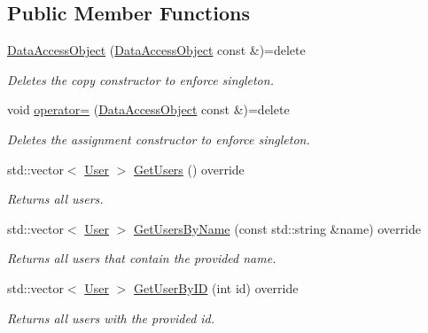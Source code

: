 \subsection*{Public Member Functions}
\begin{DoxyCompactItemize}
\item 
\mbox{\hyperlink{classcadg__rest_1_1_data_access_object_a406ab0c0f47900529133afc7db6c3bca}{Data\+Access\+Object}} (\mbox{\hyperlink{classcadg__rest_1_1_data_access_object}{Data\+Access\+Object}} const \&)=delete
\begin{DoxyCompactList}\small\item\em Deletes the copy constructor to enforce singleton. \end{DoxyCompactList}\item 
void \mbox{\hyperlink{classcadg__rest_1_1_data_access_object_ac17c7c54dd84c1d512c83cb6a15bb894}{operator=}} (\mbox{\hyperlink{classcadg__rest_1_1_data_access_object}{Data\+Access\+Object}} const \&)=delete
\begin{DoxyCompactList}\small\item\em Deletes the assignment constructor to enforce singleton. \end{DoxyCompactList}\item 
std\+::vector$<$ \mbox{\hyperlink{structcadg__rest_1_1_user}{User}} $>$ \mbox{\hyperlink{classcadg__rest_1_1_data_access_object_a52d1c1333fc65e6a3a6276d044296ca0}{Get\+Users}} () override
\begin{DoxyCompactList}\small\item\em Returns all users. \end{DoxyCompactList}\item 
std\+::vector$<$ \mbox{\hyperlink{structcadg__rest_1_1_user}{User}} $>$ \mbox{\hyperlink{classcadg__rest_1_1_data_access_object_af08156c296e0ec18d9885292a549eef8}{Get\+Users\+By\+Name}} (const std\+::string \&name) override
\begin{DoxyCompactList}\small\item\em Returns all users that contain the provided name. \end{DoxyCompactList}\item 
std\+::vector$<$ \mbox{\hyperlink{structcadg__rest_1_1_user}{User}} $>$ \mbox{\hyperlink{classcadg__rest_1_1_data_access_object_a54d23c50e3be7d80503f43e7ff82752e}{Get\+User\+By\+ID}} (int id) override
\begin{DoxyCompactList}\small\item\em Returns all users with the provided id. \end{DoxyCompactList}\item 

\end{DoxyCompactItemize}
